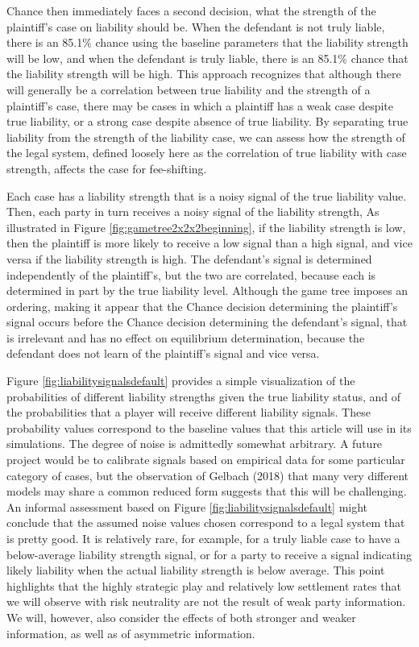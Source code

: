 \documentclass{article}
\begin{document}
Chance then immediately faces a second decision, what the strength of the plaintiff's case on liability should be. When the defendant is not truly liable, there is an 85.1\% chance using the baseline parameters that the liability strength will be low, and when the defendant is truly liable, there is an 85.1\% chance that the liability strength will be high. This approach recognizes that although there will generally be a correlation between true liability and the strength of a plaintiff's case, there may be cases in which a plaintiff has a weak case despite true liability, or a strong case despite absence of true liability. By separating true liability from the strength of the liability case, we can assess how the strength of the legal system, defined loosely here as the correlation of true liability with case strength, affects the case for fee-shifting. 

Each case has a liability strength that is a noisy signal of the true liability value. Then, each party in turn receives a noisy signal of the liability strength,  As illustrated in Figure \ref{fig:gametree2x2x2beginning}, if the liability strength is low, then the plaintiff is more likely to receive a low signal than a high signal, and vice versa if the liability strength is high. The defendant's signal is determined independently of the plaintiff's, but the two are correlated, because each is determined in part by the true liability level. Although the game tree imposes an ordering, making it appear that the Chance decision determining the plaintiff's signal occurs before the Chance decision determining the defendant's signal, that is irrelevant and has no effect on equilibrium determination, because the defendant does not learn of the plaintiff's signal and vice versa.

Figure \ref{fig:liabilitysignalsdefault} provides a simple visualization of the probabilities of different liability strengths given the true liability status, and of the probabilities that a player will receive different liability signals. These probability values correspond to the baseline values that this article will use in its simulations. The degree of noise is admittedly somewhat arbitrary. A future project would be to calibrate signals based on empirical data for some particular category of cases, but the observation of Gelbach (2018) \cite{gelbach} that many very different models may share a common reduced form suggests that this will be challenging. An informal assessment based on Figure \ref{fig:liabilitysignalsdefault} might conclude that the assumed noise values chosen correspond to a legal system that is pretty good. It is relatively rare, for example, for a truly liable case to have a below-average liability strength signal, or for a party to receive a signal indicating likely liability when the actual liability strength is below average. This point highlights that the highly strategic play and relatively low settlement rates that we will observe with risk neutrality are not the result of weak party information. We will, however, also consider the effects of both stronger and weaker information, as well as of asymmetric information.
\end{document}
